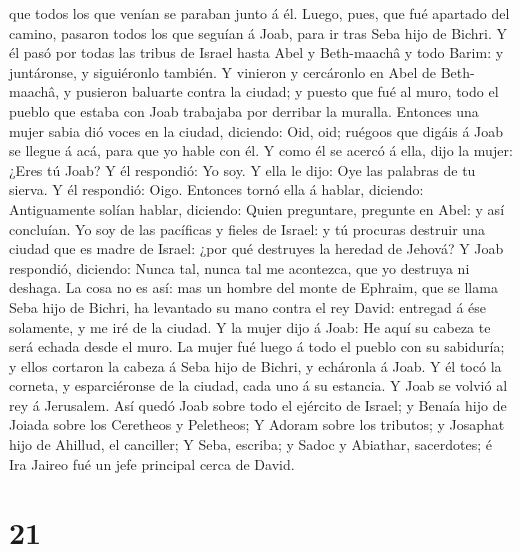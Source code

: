 que todos los que venían se paraban junto á él.  Luego,
pues, que fué apartado del camino, pasaron todos los que seguían á Joab,
para ir tras Seba hijo de Bichri.  Y él pasó por todas
las tribus de Israel hasta Abel y Beth-maachâ y todo Barim: y
juntáronse, y siguiéronlo también.  Y vinieron y
cercáronlo en Abel de Beth-maachâ, y pusieron baluarte contra la ciudad;
y puesto que fué al muro, todo el pueblo que estaba con Joab trabajaba
por derribar la muralla.  Entonces una mujer sabia dió
voces en la ciudad, diciendo: Oid, oid; ruégoos que digáis á Joab se
llegue á acá, para que yo hable con él.  Y como él se
acercó á ella, dijo la mujer: ¿Eres tú Joab? Y él respondió: Yo soy. Y
ella le dijo: Oye las palabras de tu sierva. Y él respondió: Oigo.
 Entonces tornó ella á hablar, diciendo: Antiguamente
solían hablar, diciendo: Quien preguntare, pregunte en Abel: y así
concluían.  Yo soy de las pacíficas y fieles de Israel: y
tú procuras destruir una ciudad que es madre de Israel: ¿por qué
destruyes la heredad de Jehová?  Y Joab respondió,
diciendo: Nunca tal, nunca tal me acontezca, que yo destruya ni deshaga.
 La cosa no es así: mas un hombre del monte de Ephraim,
que se llama Seba hijo de Bichri, ha levantado su mano contra el rey
David: entregad á ése solamente, y me iré de la ciudad. Y la mujer dijo
á Joab: He aquí su cabeza te será echada desde el muro. 
La mujer fué luego á todo el pueblo con su sabiduría; y ellos cortaron
la cabeza á Seba hijo de Bichri, y echáronla á Joab. Y él tocó la
corneta, y esparciéronse de la ciudad, cada uno á su estancia. Y Joab se
volvió al rey á Jerusalem.  Así quedó Joab sobre todo el
ejército de Israel; y Benaía hijo de Joiada sobre los Ceretheos y
Peletheos;  Y Adoram sobre los tributos; y Josaphat hijo
de Ahillud, el canciller;  Y Seba, escriba; y Sadoc y
Abiathar, sacerdotes; é Ira Jaireo fué un jefe principal cerca de David.

\hypertarget{section-20}{%
\section{21}\label{section-20}}

